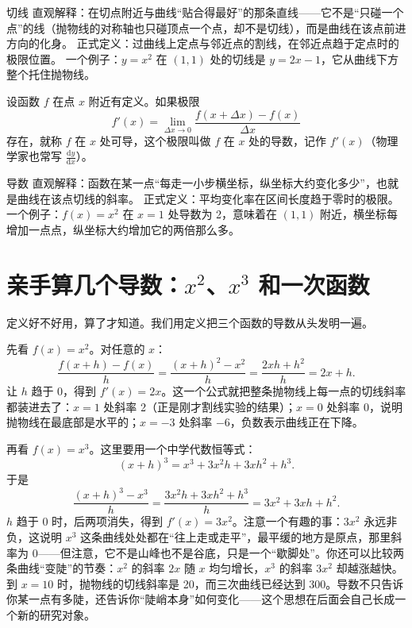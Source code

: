 \begin{shuyu}{切线}
直观解释：在切点附近与曲线“贴合得最好”的那条直线——它不是“只碰一个点”的线（抛物线的对称轴也只碰顶点一个点，却不是切线），而是曲线在该点前进方向的化身。
正式定义：过曲线上定点与邻近点的割线，在邻近点趋于定点时的极限位置。
一个例子：$y=x^2$ 在 $(1,1)$ 处的切线是 $y=2x-1$，它从曲线下方整个托住抛物线。
\end{shuyu}

\begin{dingyi}[导数]
设函数 $f$ 在点 $x$ 附近有定义。如果极限
\[
f'(x)=\lim_{\Delta x\to 0}\frac{f(x+\Delta x)-f(x)}{\Delta x}
\]
存在，就称 $f$ 在 $x$ 处可导，这个极限叫做 $f$ 在 $x$ 处的导数，记作 $f'(x)$（物理学家也常写 $\frac{\mathrm{d}y}{\mathrm{d}x}$）。
\end{dingyi}

\begin{shuyu}{导数}
直观解释：函数在某一点“每走一小步横坐标，纵坐标大约变化多少”，也就是曲线在该点切线的斜率。
正式定义：平均变化率在区间长度趋于零时的极限。
一个例子：$f(x)=x^2$ 在 $x=1$ 处导数为 2，意味着在 $(1,1)$ 附近，横坐标每增加一点点，纵坐标大约增加它的两倍那么多。
\end{shuyu}

\section{亲手算几个导数：$x^2$、$x^3$ 和一次函数}

定义好不好用，算了才知道。我们用定义把三个函数的导数从头发明一遍。

先看 $f(x)=x^2$。对任意的 $x$：
\[
\frac{f(x+h)-f(x)}{h}=\frac{(x+h)^2-x^2}{h}=\frac{2xh+h^2}{h}=2x+h.
\]
让 $h$ 趋于 0，得到 $f'(x)=2x$。这一个公式就把整条抛物线上每一点的切线斜率都装进去了：$x=1$ 处斜率 2（正是刚才割线实验的结果）；$x=0$ 处斜率 0，说明抛物线在最底部是水平的；$x=-3$ 处斜率 $-6$，负数表示曲线正在下降。

再看 $f(x)=x^3$。这里要用一个中学代数恒等式：
\[
(x+h)^3=x^3+3x^2h+3xh^2+h^3.
\]
于是
\[
\frac{(x+h)^3-x^3}{h}=\frac{3x^2h+3xh^2+h^3}{h}=3x^2+3xh+h^2.
\]
$h$ 趋于 0 时，后两项消失，得到 $f'(x)=3x^2$。注意一个有趣的事：$3x^2$ 永远非负，这说明 $x^3$ 这条曲线处处都在“往上走或走平”，最平缓的地方是原点，那里斜率为 0——但注意，它不是山峰也不是谷底，只是一个“歇脚处”。你还可以比较两条曲线“变陡”的节奏：$x^2$ 的斜率 $2x$ 随 $x$ 均匀增长，$x^3$ 的斜率 $3x^2$ 却越涨越快。到 $x=10$ 时，抛物线的切线斜率是 20，而三次曲线已经达到 300。导数不只告诉你某一点有多陡，还告诉你“陡峭本身”如何变化——这个思想在后面会自己长成一个新的研究对象。

